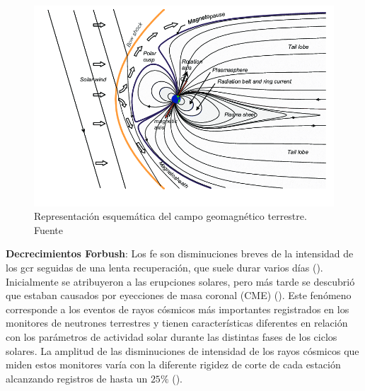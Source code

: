 \begin{figure}
    \centering
    \includegraphics[width=1\linewidth]{Figs/Schematic-representation-of-the-near-Earths-magnetosphere.png}
    \caption{Representación esquemática del campo geomagnético terrestre. Fuente \cite{tenerani_2012}}
    \label{magnetosfera}
\end{figure}
\textbf{Decrecimientos Forbush}: Los \gls{fe} son disminuciones breves de la intensidad de los \gls{gcr} seguidas de una lenta recuperación, que suele durar varios días (\cite{forbush_1954}). Inicialmente se atribuyeron a las erupciones solares, pero más tarde se descubrió que estaban causados por eyecciones de masa coronal (CME) (\cite{lingri_2016}). Este fenómeno corresponde a los eventos de rayos cósmicos más importantes registrados en los monitores de neutrones terrestres y tienen características diferentes en relación con los parámetros de actividad solar durante las distintas fases de los ciclos solares. La amplitud de las disminuciones de intensidad de los rayos cósmicos que miden estos monitores varía con la diferente rigidez de corte de cada estación alcanzando registros de hasta un $25\%$ (\cite{cane2000}).

